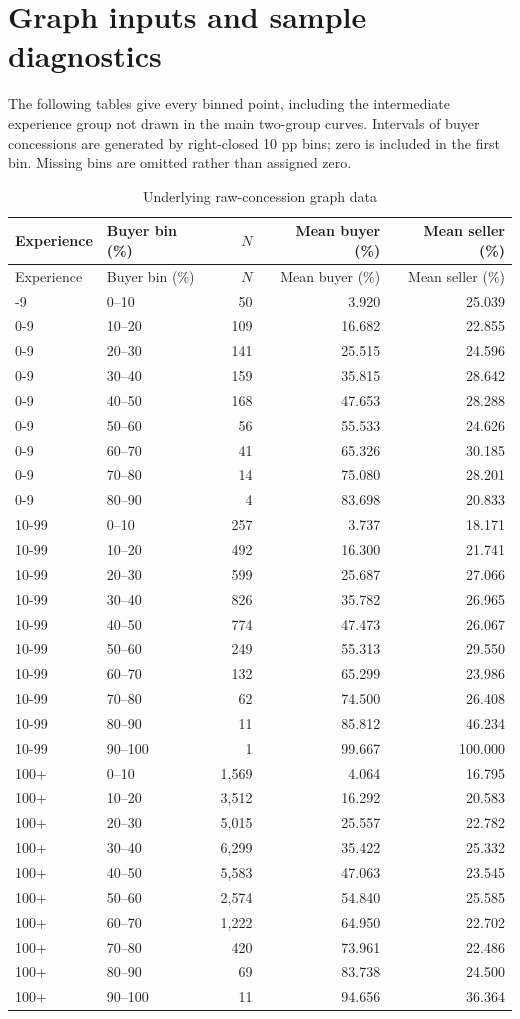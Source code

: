 \documentclass[11pt,a4paper]{article}
\begin{document}
\clearpage
\section{Graph inputs and sample diagnostics}
The following tables give every binned point, including the intermediate
experience group not drawn in the main two-group curves. Intervals of buyer
concessions are generated by right-closed 10 pp bins; zero is included in the
first bin. Missing bins are omitted rather than assigned zero.
\small
\begin{longtable}{llrrr}
\caption{Underlying raw-concession graph data}\label{tab:bins}\\
\toprule
Experience & Buyer bin (\%) & $N$ & Mean buyer (\%) & Mean seller (\%) \\
\midrule\endfirsthead
\toprule
Experience & Buyer bin (\%) & $N$ & Mean buyer (\%) & Mean seller (\%) \\
\midrule\endhead
\bottomrule\endfoot
0-9 & 0--10 & 50 & 3.920 & 25.039 \\
0-9 & 10--20 & 109 & 16.682 & 22.855 \\
0-9 & 20--30 & 141 & 25.515 & 24.596 \\
0-9 & 30--40 & 159 & 35.815 & 28.642 \\
0-9 & 40--50 & 168 & 47.653 & 28.288 \\
0-9 & 50--60 & 56 & 55.533 & 24.626 \\
0-9 & 60--70 & 41 & 65.326 & 30.185 \\
0-9 & 70--80 & 14 & 75.080 & 28.201 \\
0-9 & 80--90 & 4 & 83.698 & 20.833 \\
10-99 & 0--10 & 257 & 3.737 & 18.171 \\
10-99 & 10--20 & 492 & 16.300 & 21.741 \\
10-99 & 20--30 & 599 & 25.687 & 27.066 \\
10-99 & 30--40 & 826 & 35.782 & 26.965 \\
10-99 & 40--50 & 774 & 47.473 & 26.067 \\
10-99 & 50--60 & 249 & 55.313 & 29.550 \\
10-99 & 60--70 & 132 & 65.299 & 23.986 \\
10-99 & 70--80 & 62 & 74.500 & 26.408 \\
10-99 & 80--90 & 11 & 85.812 & 46.234 \\
10-99 & 90--100 & 1 & 99.667 & 100.000 \\
100+ & 0--10 & 1,569 & 4.064 & 16.795 \\
100+ & 10--20 & 3,512 & 16.292 & 20.583 \\
100+ & 20--30 & 5,015 & 25.557 & 22.782 \\
100+ & 30--40 & 6,299 & 35.422 & 25.332 \\
100+ & 40--50 & 5,583 & 47.063 & 23.545 \\
100+ & 50--60 & 2,574 & 54.840 & 25.585 \\
100+ & 60--70 & 1,222 & 64.950 & 22.702 \\
100+ & 70--80 & 420 & 73.961 & 22.486 \\
100+ & 80--90 & 69 & 83.738 & 24.500 \\
100+ & 90--100 & 11 & 94.656 & 36.364 \\
\end{longtable}
\end{document}
